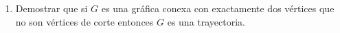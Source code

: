 \documentclass[12pt]{report}
\begin{document}
\begin{enumerate}


\item Demostrar que si $G$ es una gráfica conexa con exactamente dos vértices que no son vértices de corte entonces $G$ es una trayectoria.



\end{enumerate}


\vspace{2cm}
\end{document}
